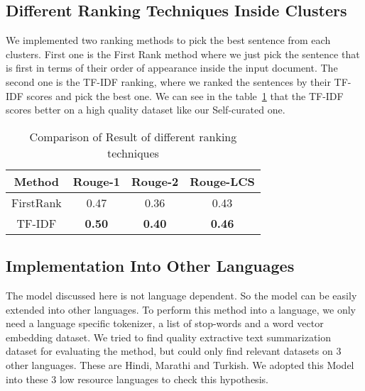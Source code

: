 \subsection{Different Ranking Techniques Inside Clusters}\label{subsec:different-ranking-techniques-inside-clusters}
We implemented two ranking methods to pick the best sentence from each clusters.
First one is the First Rank method where we just pick the sentence that is first in terms of their order of
appearance inside the input document.
The second one is the TF-IDF ranking, where we ranked the sentences by their TF-IDF scores and pick the best one.
We can see in the table~\ref{tab:ranking} that the TF-IDF scores better on a high quality dataset like our Self-curated one.

\begin{table}\label{tab:ranking}
    \centering
    \begin{tabular}{cccc}\hline
        Method      & Rouge-1       & Rouge-2       & Rouge-LCS     \\\hline
        FirstRank   & 0.47          & 0.36          & 0.43          \\
        TF-IDF      & \textbf{0.50} & \textbf{0.40} & \textbf{0.46} \\\hline
    \end{tabular}
    \caption{Comparison of Result of different ranking techniques}
\end{table}

\subsection{Implementation Into Other Languages}\label{subsec:implementation-into-other-languages}
The model discussed here is not language dependent.
So the model can be easily extended into other languages.
To perform this method into a language, we only need a language specific tokenizer, a list of stop-words and
a word vector embedding dataset.
We tried to find quality extractive text summarization dataset for evaluating the method, but could only
find relevant datasets on 3 other languages.
These are Hindi, Marathi and Turkish.
We adopted this Model into these 3 low resource languages to check this hypothesis.\\


